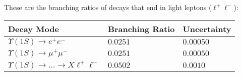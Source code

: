 \documentclass[12pt]{article}
\begin{document}
\vspace{0.25 cm}

\noindent These are the branching ratios of decays that end in light leptons ($\ell^+ \ell^-$):

\vspace{0.25 cm}
\noindent \begin{tabular}{p{3.5 in} p{1.5 in} p{1 in}}
Decay Mode & Branching Ratio & Uncertainty \\ \hline
$   \Upsilon(1S) \to e^+ e^-                      $ & $   0.0251   $ & $   0.00050   $ \\ 
$   \Upsilon(1S) \to \mu^+ \mu^-                  $ & $   0.0251   $ & $   0.00050   $ \\\hline\hline
$   \Upsilon(1S) \to \ldots \to X \ell^+ \ell^-   $ & $   0.0502   $ & $   0.0010    $ \\\hline
\end{tabular}

\vspace{0.5 cm}
\end{document}
